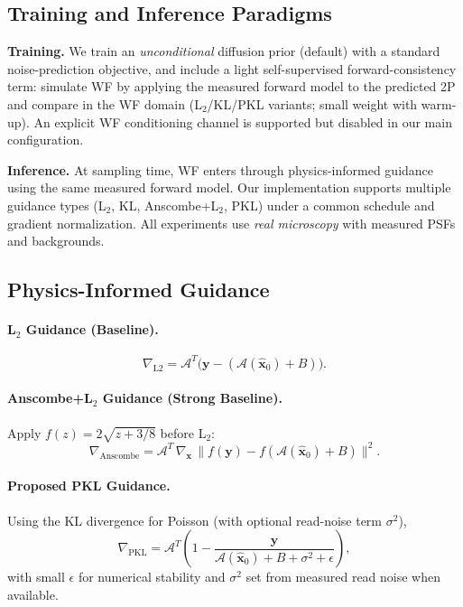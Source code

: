 \documentclass{article}
\newcommand{\wf}{WF\xspace}
\newcommand{\twop}{2P\xspace}
\begin{document}
\subsection{Training and Inference Paradigms}
\textbf{Training.} We train an \emph{unconditional} diffusion prior (default) with a standard noise-prediction objective, and include a light self-supervised forward-consistency term: simulate \wf by applying the measured forward model to the predicted \twop and compare in the \wf domain (L$_2$/KL/PKL variants; small weight with warm-up). An explicit \wf conditioning channel is supported but disabled in our main configuration.

\textbf{Inference.} At sampling time, \wf enters through physics-informed guidance using the same measured forward model. Our implementation supports multiple guidance types (L$_2$, KL, Anscombe+L$_2$, PKL) under a common schedule and gradient normalization. All experiments use \emph{real microscopy} with measured PSFs and backgrounds.

\subsection{Physics-Informed Guidance}
\paragraph{L$_2$ Guidance (Baseline).}
\begin{equation}
\nabla_{\text{L2}} = \mathcal{A}^T\big(\mathbf{y} - (\mathcal{A}(\hat{\mathbf{x}}_0) + B)\big).
\end{equation}

\paragraph{Anscombe+L$_2$ Guidance (Strong Baseline).}
Apply $f(z)=2\sqrt{z + 3/8}$ before L$_2$:
\begin{equation}
\nabla_{\text{Anscombe}} = \mathcal{A}^T\,\nabla_{\mathbf{x}}\,\lVert f(\mathbf{y}) - f(\mathcal{A}(\hat{\mathbf{x}}_0)+B)\rVert^2.
\end{equation}

\paragraph{Proposed PKL Guidance.}
Using the KL divergence for Poisson (with optional read-noise term $\sigma^2$),
\begin{equation}
\nabla_{\text{PKL}} = \mathcal{A}^T\left(1 - \frac{\mathbf{y}}{\mathcal{A}(\hat{\mathbf{x}}_0)+B+\sigma^2+\epsilon}\right),
\end{equation}
with small $\epsilon$ for numerical stability and $\sigma^2$ set from measured read noise when available.
\end{document}
